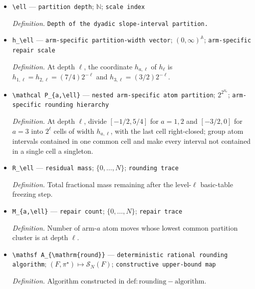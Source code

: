 \documentclass{article}
\begin{document}
\begin{itemize}
  \item \texttt{\textbackslash{}\allowbreak{}ell} --- \texttt{partition depth}; \(\mathbb N\); \texttt{scale index}
  \par\smallskip\noindent\emph{Definition.} \texttt{Depth of the dyadic slope-\allowbreak{}interval partition.}
  \item \texttt{h\_\allowbreak{}\textbackslash{}\allowbreak{}ell} --- \texttt{arm-\allowbreak{}specific partition-\allowbreak{}width vector}; \((0,\infty)^{\mathbb A}\); \texttt{arm-\allowbreak{}specific repair scale}
  \par\smallskip\noindent\emph{Definition.} At depth \(\ell\), the coordinate \(h_{a,\ell}\) of \(h_\ell\) is \(h_{1,\ell}=h_{2,\ell}=(7/4)2^{-\ell}\) and \(h_{3,\ell}=(3/2)2^{-\ell}\).
  \item \texttt{\textbackslash{}\allowbreak{}mathcal P\_\allowbreak{}\{a,\allowbreak{}\textbackslash{}\allowbreak{}ell\}\allowbreak{}} --- \texttt{nested arm-\allowbreak{}specific atom partition}; \(2^{2^{S_a}}\); \texttt{arm-\allowbreak{}specific rounding hierarchy}
  \par\smallskip\noindent\emph{Definition.} At depth \(\ell\), divide \([-1/2,5/4]\) for \(a=1,2\) and \([-3/2,0]\) for \(a=3\) into \(2^\ell\) cells of width \(h_{a,\ell}\), with the last cell right-closed; group atom intervals contained in one common cell and make every interval not contained in a single cell a singleton.
  \item \texttt{R\_\allowbreak{}\textbackslash{}\allowbreak{}ell} --- \texttt{residual mass}; \(\{0,\ldots,N\}\); \texttt{rounding trace}
  \par\smallskip\noindent\emph{Definition.} Total fractional mass remaining after the level-\(\ell\) basic-table freezing step.
  \item \texttt{M\_\allowbreak{}\{a,\allowbreak{}\textbackslash{}\allowbreak{}ell\}\allowbreak{}} --- \texttt{repair count}; \(\{0,\ldots,N\}\); \texttt{repair trace}
  \par\smallskip\noindent\emph{Definition.} Number of arm-\(a\) atom moves whose lowest common partition cluster is at depth \(\ell\).
  \item \texttt{\textbackslash{}\allowbreak{}mathsf A\_\allowbreak{}\{\textbackslash{}\allowbreak{}mathrm\{round\}\allowbreak{}\}\allowbreak{}} --- \texttt{deterministic rational rounding algorithm}; \((F,\pi^\star)\mapsto\mathcal S_N(F)\); \texttt{constructive upper-\allowbreak{}bound map}
  \par\smallskip\noindent\emph{Definition.} Algorithm constructed in \(\mathrm{def:rounding-algorithm}\).

\end{itemize}
\end{document}
